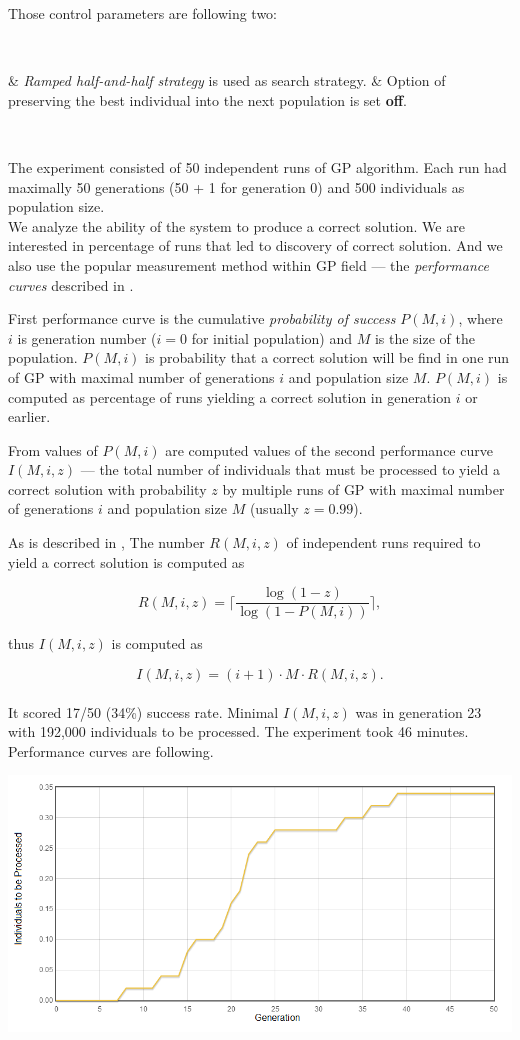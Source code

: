 \documentclass[12pt,a4paper]{report}
\newenvironment{enum}
{\begin{easylist}[itemize]}
{\end{easylist}}
\begin{document}
Those control parameters are following two:

~\begin{enum}
 & \textit{Ramped half-and-half strategy} is used as search strategy.
 & Option of preserving the best individual into the next population is set \textbf{off}.
\end{enum}~

The experiment consisted of 50 independent runs of GP algorithm.
Each run had maximally 50 generations (50 + 1 for generation 0)
and 500 individuals as population size.\\

We analyze the ability of the system to produce a correct solution.
We are interested in percentage of runs that led to discovery of
correct solution. And we also use the popular measurement  
method within GP field --- the \textit{performance curves}
described in \cite{koza92}.

First performance curve is the cumulative \textit{probability of success}
$P(M,i)$, where $i$ is generation number ($i = 0$ for initial population) 
and $M$ is the size of the population. 
$P(M,i)$ is probability that a correct solution will
be find in one run of GP with maximal number of generations $i$ and 
population size $M$. $P(M,i)$ is computed as percentage of 
runs yielding a correct solution in generation $i$ or earlier.

From values of $P(M,i)$ are computed values of the second performance curve
$I(M,i,z)$
--- the total number of individuals that must be processed to yield a correct
solution with probability $z$ by multiple runs of GP with maximal 
number of generations $i$ and population size $M$ (usually $z = 0.99$).

As is described in \cite{koza92},
The number $R(M,i,z)$ of independent runs required to yield a correct solution 
is computed as
 
$$ R(M,i,z) = \lceil\frac{\log(1-z)}{\log(1-P(M,i))}\rceil ,$$

thus $I(M,i,z)$ is computed as

$$I(M,i,z) = (i+1) \cdot M \cdot R(M,i,z) .$$\\

It scored 17/50 (34\%) success rate. 
Minimal $I(M,i,z)$ was in generation 23 
with 192,000 individuals to be processed.
The experiment took 46 minutes.\\

Performance curves are following.

\includegraphics[scale=0.65]{reports/SSR/1/probabs.png}
\end{document}

